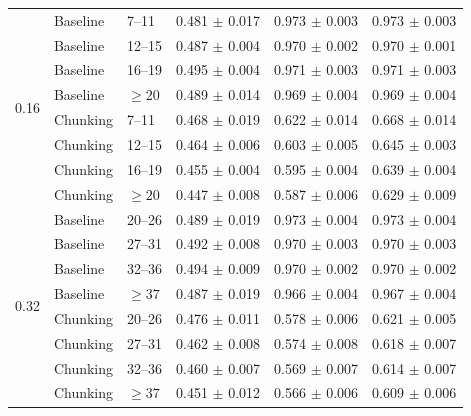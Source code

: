 \begin{table}[t]
\begin{tabular}{@{}c l l ccc@{}}
\multirow{8}{*}{0.16} & Baseline & 7--11 & 0.481 $\pm$ 0.017 & 0.973 $\pm$ 0.003 & 0.973 $\pm$ 0.003 \\
& Baseline & 12--15 & 0.487 $\pm$ 0.004 & 0.970 $\pm$ 0.002 & 0.970 $\pm$ 0.001 \\
& Baseline & 16--19 & 0.495 $\pm$ 0.004 & 0.971 $\pm$ 0.003 & 0.971 $\pm$ 0.003 \\
& Baseline & $\geq 20$ & 0.489 $\pm$ 0.014 & 0.969 $\pm$ 0.004 & 0.969 $\pm$ 0.004 \\
& Chunking & 7--11 & 0.468 $\pm$ 0.019 & 0.622 $\pm$ 0.014 & 0.668 $\pm$ 0.014 \\
& Chunking & 12--15 & 0.464 $\pm$ 0.006 & 0.603 $\pm$ 0.005 & 0.645 $\pm$ 0.003 \\
& Chunking & 16--19 & 0.455 $\pm$ 0.004 & 0.595 $\pm$ 0.004 & 0.639 $\pm$ 0.004 \\
& Chunking & $\geq 20$ & 0.447 $\pm$ 0.008 & 0.587 $\pm$ 0.006 & 0.629 $\pm$ 0.009 \\
\midrule

\multirow{8}{*}{0.32} & Baseline & 20--26 & 0.489 $\pm$ 0.019 & 0.973 $\pm$ 0.004 & 0.973 $\pm$ 0.004 \\
& Baseline & 27--31 & 0.492 $\pm$ 0.008 & 0.970 $\pm$ 0.003 & 0.970 $\pm$ 0.003 \\
& Baseline & 32--36 & 0.494 $\pm$ 0.009 & 0.970 $\pm$ 0.002 & 0.970 $\pm$ 0.002 \\
& Baseline & $\geq 37$ & 0.487 $\pm$ 0.019 & 0.966 $\pm$ 0.004 & 0.967 $\pm$ 0.004 \\
& Chunking & 20--26 & 0.476 $\pm$ 0.011 & 0.578 $\pm$ 0.006 & 0.621 $\pm$ 0.005 \\
& Chunking & 27--31 & 0.462 $\pm$ 0.008 & 0.574 $\pm$ 0.008 & 0.618 $\pm$ 0.007 \\
& Chunking & 32--36 & 0.460 $\pm$ 0.007 & 0.569 $\pm$ 0.007 & 0.614 $\pm$ 0.007 \\
& Chunking & $\geq 37$ & 0.451 $\pm$ 0.012 & 0.566 $\pm$ 0.006 & 0.609 $\pm$ 0.006 \\

\bottomrule
\end{tabular}
\end{table}
